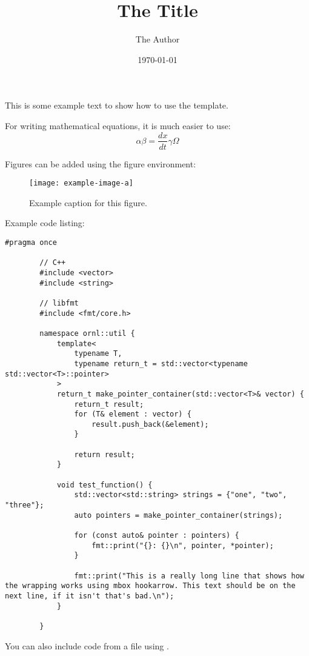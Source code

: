\documentclass{article}
\title{The Title}
\author{The Author}
\date{\today}
\begin{document}
    \maketitle
    \thispagestyle{empty}

    This is some example text to show how to use the template.

    For writing mathematical equations, it is much easier to use:
    \[
    	\alpha\beta = \frac{dx}{dt}\gamma\Omega
    \]

    Figures can be added using the figure environment:
    \begin{figure}[H]
        \centering
        \texttt{[image: example-image-a]}
        \caption{Example caption for this figure.}
    \end{figure}

    Example code listing:
    \begin{lstlisting}[gobble=8]
        #pragma once

        // C++
        #include <vector>
        #include <string>

        // libfmt
        #include <fmt/core.h>

        namespace ornl::util {
            template<
                typename T,
                typename return_t = std::vector<typename std::vector<T>::pointer>
            >
            return_t make_pointer_container(std::vector<T>& vector) {
                return_t result;
                for (T& element : vector) {
                    result.push_back(&element);
                }

                return result;
            }

            void test_function() {
                std::vector<std::string> strings = {"one", "two", "three"};
                auto pointers = make_pointer_container(strings);

                for (const auto& pointer : pointers) {
                    fmt::print("{}: {}\n", pointer, *pointer);
                }

                fmt::print("This is a really long line that shows how the wrapping works using mbox hookarrow. This text should be on the next line, if it isn't that's bad.\n");
            }

        }
    \end{lstlisting}

    You can also include code from a file using \verb||.
\end{document}
